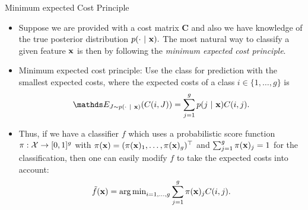 \documentclass[11pt,compress,t,notes=noshow, xcolor=table]{beamer}
\begin{document}
\begin{vbframe}{Minimum expected Cost Principle}
	\footnotesize{

		\begin{itemize}\footnotesize
			\item Suppose we are provided with a cost matrix $\mathbf{C}$ and also we have knowledge of the true posterior distribution $p(\cdot ~|~ \mathbf{x}).$ The most natural way to classify a given feature $\mathbf{x}$ is then by following the \emph{minimum expected cost principle}.
%			
			\item Minimum expected cost principle: Use the class for prediction with the smallest expected costs, where the expected costs of a class $i\in\{1,\ldots,g\}$ is
%			
			$$ 	\E_{J \sim p(\cdot ~|~ \xv)}( C(i,J) ) = \sum_{j=1}^g 	p(j ~|~ \xv) C(i,j).	$$
			\item Thus, if we have a classifier $f$ which uses a probabilistic score function $\pi:\mathcal{X} \to [0,1]^g$ with $\pi(\mathbf{x}) = (\pi(\mathbf{x})_1,\ldots,\pi(\mathbf{x})_g)^\top$ and $\sum_{j=1}^g \pi(\mathbf{x})_j = 1$ for the classification, then one can easily modify $f$ to take the expected costs into account:
%			
			$$  \tilde f (\mathbf{x}) = \operatorname{arg\,min}_{i=1,\ldots,g} \sum_{j=1}^g 	\pi(\mathbf{x})_j C(i,j). $$
%					
		\end{itemize}
	}
\end{vbframe}
\end{document}
